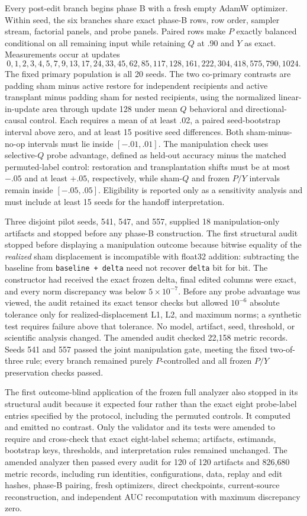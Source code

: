 \documentclass[11pt,a4paper]{article}
\begin{document}
Every post-edit branch begins phase B with a fresh empty AdamW optimizer. Within seed, the six branches share exact phase-B rows, row order, sampler stream, factorial panels, and probe panels. Paired rows make $P$ exactly balanced conditional on all remaining input while retaining $Q$ at .90 and $Y$ as exact. Measurements occur at updates
\[
0,1,2,3,4,5,7,9,13,17,24,33,45,62,85,117,128,161,222,304,418,575,790,1024.
\]
The fixed primary population is all 20 seeds. The two co-primary contrasts are padding sham minus active restore for independent recipients and active transplant minus padding sham for nested recipients, using the normalized linear-in-update area through update 128 under mean $Q$ behavioral and directional-causal control. Each requires a mean of at least .02, a paired seed-bootstrap interval above zero, and at least 15 positive seed differences. Both sham-minus-no-op intervals must lie inside $[-.01,.01]$. The manipulation check uses selective-$Q$ probe advantage, defined as held-out accuracy minus the matched permuted-label control: restoration and transplantation shifts must be at most $-.05$ and at least $+.05$, respectively, while sham-$Q$ and frozen $P/Y$ intervals remain inside $[-.05,.05]$. Eligibility is reported only as a sensitivity analysis and must include at least 15 seeds for the handoff interpretation.

Three disjoint pilot seeds, 541, 547, and 557, supplied 18 manipulation-only artifacts and stopped before any phase-B construction. The first structural audit stopped before displaying a manipulation outcome because bitwise equality of the \emph{realized} sham displacement is incompatible with float32 addition: subtracting the baseline from \texttt{baseline + delta} need not recover \texttt{delta} bit for bit. The constructor had received the exact frozen delta, final edited columns were exact, and every norm discrepancy was below $5\times10^{-7}$. Before any probe advantage was viewed, the audit retained its exact tensor checks but allowed $10^{-6}$ absolute tolerance only for realized-displacement L1, L2, and maximum norms; a synthetic test requires failure above that tolerance. No model, artifact, seed, threshold, or scientific analysis changed. The amended audit checked 22,158 metric records. Seeds 541 and 557 passed the joint manipulation gate, meeting the fixed two-of-three rule; every branch remained purely $P$-controlled and all frozen $P/Y$ preservation checks passed.

The first outcome-blind application of the frozen full analyzer also stopped in its structural audit because it expected four rather than the exact eight probe-label entries specified by the protocol, including the permuted controls. It computed and emitted no contrast. Only the validator and its tests were amended to require and cross-check that exact eight-label schema; artifacts, estimands, bootstrap keys, thresholds, and interpretation rules remained unchanged. The amended analyzer then passed every audit for 120 of 120 artifacts and 826,680 metric records, including run identities, configurations, data, replay and edit hashes, phase-B pairing, fresh optimizers, direct checkpoints, current-source reconstruction, and independent AUC recomputation with maximum discrepancy zero.
\end{document}
